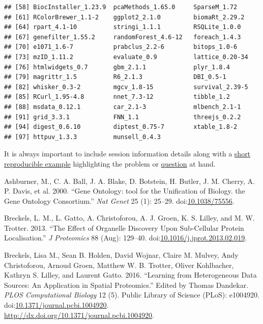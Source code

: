 \begin{verbatim}
## [58] BiocInstaller_1.23.9  pcaMethods_1.65.0     SparseM_1.72         
## [61] RColorBrewer_1.1-2    ggplot2_2.1.0         biomaRt_2.29.2       
## [64] rpart_4.1-10          stringi_1.1.1         RSQLite_1.0.0        
## [67] genefilter_1.55.2     randomForest_4.6-12   foreach_1.4.3        
## [70] e1071_1.6-7           prabclus_2.2-6        bitops_1.0-6         
## [73] mzID_1.11.2           evaluate_0.9          lattice_0.20-34      
## [76] htmlwidgets_0.7       gbm_2.1.1             plyr_1.8.4           
## [79] magrittr_1.5          R6_2.1.3              DBI_0.5-1            
## [82] whisker_0.3-2         mgcv_1.8-15           survival_2.39-5      
## [85] RCurl_1.95-4.8        nnet_7.3-12           tibble_1.2           
## [88] msdata_0.12.1         car_2.1-3             mlbench_2.1-1        
## [91] grid_3.3.1            FNN_1.1               threejs_0.2.2        
## [94] digest_0.6.10         diptest_0.75-7        xtable_1.8-2         
## [97] httpuv_1.3.3          munsell_0.4.3
\end{verbatim}

It is always important to include session information details along with
a \href{http://adv-r.had.co.nz/Reproducibility.html}{short reproducible
example} highlighting the problem or
\href{https://support.bioconductor.org/}{question} at hand.

Ashburner, M., C. A. Ball, J. A. Blake, D. Botstein, H. Butler, J. M.
Cherry, A. P. Davis, et al. 2000. ``Gene Ontology: tool for the
Unification of Biology. the Gene Ontology Consortium.'' \emph{Nat Genet}
25 (1): 25--29.
doi:\href{http://dx.doi.org/10.1038/75556}{10.1038/75556}.

Breckels, L. M., L. Gatto, A. Christoforou, A. J. Groen, K. S. Lilley,
and M. W. Trotter. 2013. ``The Effect of Organelle Discovery Upon
Sub-Cellular Protein Localisation.'' \emph{J Proteomics} 88 (Aug):
129--40.
doi:\href{http://dx.doi.org/10.1016/j.jprot.2013.02.019}{10.1016/j.jprot.2013.02.019}.

Breckels, Lisa M., Sean B. Holden, David Wojnar, Claire M. Mulvey, Andy
Christoforou, Arnoud Groen, Matthew W. B. Trotter, Oliver Kohlbacher,
Kathryn S. Lilley, and Laurent Gatto. 2016. ``Learning from
Heterogeneous Data Sources: An Application in Spatial Proteomics.''
Edited by Thomas Dandekar. \emph{PLOS Computational Biology} 12 (5).
Public Library of Science (PLoS): e1004920.
doi:\href{http://dx.doi.org/10.1371/journal.pcbi.1004920}{10.1371/journal.pcbi.1004920}.
\url{http://dx.doi.org/10.1371/journal.pcbi.1004920}.

